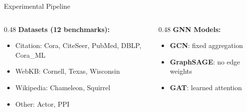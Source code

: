 \documentclass[aspectratio=169]{beamer}
\begin{document}
\begin{frame}{\faProjectDiagram \quad Experimental Pipeline}
    \vspace{0.4cm}
    \begin{columns}[T]
        \begin{column}{0.48\textwidth}
            \centering
            \textbf{\textcolor{cyanneon}{\faDatabase \quad Datasets (12 benchmarks):}}
            \begin{itemize}\setlength{\itemsep}{0pt}
                \item Citation: Cora, CiteSeer, PubMed, DBLP, Cora\_ML
                \item WebKB: Cornell, Texas, Wisconsin
                \item Wikipedia: Chameleon, Squirrel
                \item Other: Actor, PPI
            \end{itemize}
        \end{column}
        \begin{column}{0.48\textwidth}
            \centering
            \textbf{\textcolor{violetelectric}{\faBrain \quad GNN Models:}}
            \begin{itemize}
                \item \textbf{GCN}: fixed aggregation
                \item \textbf{GraphSAGE}: no edge weights
                \item \textbf{GAT}: learned attention
            \end{itemize}
        \end{column}
    \end{columns}
\end{frame}
\end{document}
